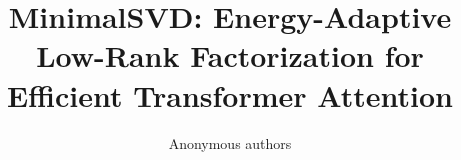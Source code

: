 \title{\textbf{MinimalSVD: Energy-Adaptive Low-Rank Factorization for Efficient Transformer Attention}}

\author{Anonymous authors}
